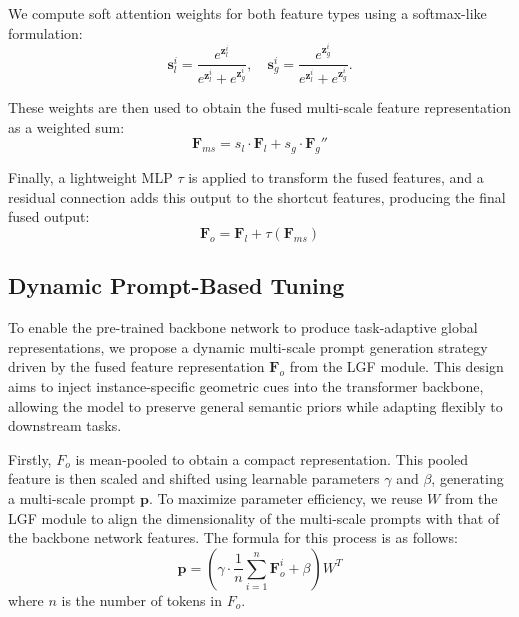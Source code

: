 We compute soft attention weights for both feature types using a softmax-like formulation:
\begin{equation}
	\mathbf{s}_l^i = \frac{e^{\mathbf{z}_l^i}}{e^{\mathbf{z}_l^i} + e^{\mathbf{z}_g^i}}, \quad
\mathbf{s}_g^i = \frac{e^{\mathbf{z}_g^i}}{e^{\mathbf{z}_l^i} + e^{\mathbf{z}_g^i}}.
\end{equation}

These weights are then used to obtain the fused multi-scale feature representation as a weighted sum:
\begin{equation}
	\mathbf{F}_{ms} = s_l \cdot \mathbf{F}_l + s_g \cdot \mathbf{F}_g''
\end{equation}

Finally, a lightweight MLP $\tau$ is applied to transform the fused features, and a residual connection adds this output to the shortcut features, producing the final fused output:
\begin{equation}
	\mathbf{F}_o = \mathbf{F}_l + \tau(\mathbf{F}_{ms})
\end{equation}


\subsection{Dynamic Prompt-Based Tuning}
\label{sec:FT_backbone}
To enable the pre-trained backbone network to produce task-adaptive global representations, we propose a dynamic multi-scale prompt generation strategy driven by the fused feature representation $\mathbf{F}_{o}$ from the LGF module. This design aims to inject instance-specific geometric cues into the transformer backbone, allowing the model to preserve general semantic priors while adapting flexibly to downstream tasks.

Firstly, $F_{o}$ is mean-pooled to obtain a compact representation. This pooled feature is then scaled and shifted using learnable parameters $\gamma$ and $\beta$, generating a multi-scale prompt $\mathbf{p}$. To maximize parameter efficiency, we reuse $W$ from the LGF module to align the dimensionality of the multi-scale prompts with that of the backbone network features. The formula for this process is as follows:
\begin{equation}
	\mathbf{p} = \left(\gamma \cdot \frac{1}{n} \sum_{i=1}^{n} \mathbf{F}_o^i + \beta \right) W^T
\end{equation}
where $n$ is the number of tokens in $F_o$.

